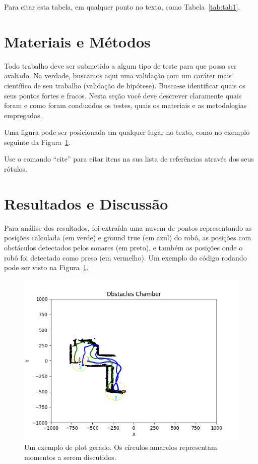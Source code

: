 \documentclass[twoside,conference,a4paper]{IEEEtran}
\begin{document}
Para citar esta tabela, em qualquer ponto no texto, como Tabela~\ref{tab:tab1}.


\section{Materiais e Métodos}

Todo trabalho deve ser submetido a algum tipo de teste para que possa ser avaliado. Na verdade, buscamos aqui uma validação com um caráter mais científico de seu trabalho (validação de hipótese). Busca-se identificar quais os seus pontos fortes e fracos. Nesta seção você deve descrever claramente quais foram e como foram conduzidos os testes, quais os materiais e as metodologias empregadas.   

Uma figura pode ser posicionada em qualquer lugar no texto, como no exemplo seguinte da Figura~\ref{fig:plot1}.


Use o comando ``cite'' para citar itens na sua lista de
referências através dos seus rótulos.


\section{Resultados e Discussão}

Para análise dos resultados, foi extraída uma nuvem de pontos representando as posições calculada (em verde) e ground true (em azul) do robô, as posições com obstáculos detectados pelos sonares (em preto), e também as posições onde o robô foi detectado como preso (em vermelho). Um exemplo do código rodando pode ser visto na Figura~\ref{fig:plot1}.

\begin{figure}[ht]
\centering
\includegraphics[width=1\hsize]{figuras/figure_3.png}
\caption{Um exemplo de plot gerado. Os círculos amarelos representam momentos a serem discutidos.}
\label{fig:plot1}
\end{figure}
\end{document}
